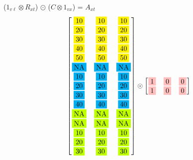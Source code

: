\documentclass[english]{beamer}
\begin{document}
\begin{frame}{(\(1_{v\ell} \otimes R_{xt}\)) \(\odot\) (\(C \otimes 1_{vx}\)) = $A_{xt}$}
\footnotesize
\[
\begin{bmatrix} 
\fcolorbox{white}{yellow}{10} & \fcolorbox{white}{yellow}{10} & \fcolorbox{white}{yellow}{10} \\ 
\fcolorbox{white}{yellow}{20} & \fcolorbox{white}{yellow}{20} & \fcolorbox{white}{yellow}{20} \\ 
\fcolorbox{white}{yellow}{30} & \fcolorbox{white}{yellow}{30} & \fcolorbox{white}{yellow}{30} \\ 
\fcolorbox{white}{yellow}{40} & \fcolorbox{white}{yellow}{40} & \fcolorbox{white}{yellow}{40} \\ 
\fcolorbox{white}{yellow}{50} & \fcolorbox{white}{yellow}{50} & \fcolorbox{white}{yellow}{50} \\ 
\fcolorbox{white}{cyan}{NA} & \fcolorbox{white}{cyan}{NA} & \fcolorbox{white}{cyan}{NA} \\
\fcolorbox{white}{cyan}{10} & \fcolorbox{white}{cyan}{10} & \fcolorbox{white}{cyan}{10} \\
\fcolorbox{white}{cyan}{20} & \fcolorbox{white}{cyan}{20} & \fcolorbox{white}{cyan}{20} \\
\fcolorbox{white}{cyan}{30} & \fcolorbox{white}{cyan}{30} & \fcolorbox{white}{cyan}{30} \\
\fcolorbox{white}{cyan}{40} & \fcolorbox{white}{cyan}{40} & \fcolorbox{white}{cyan}{40} \\ 
\fcolorbox{white}{lime}{NA} & \fcolorbox{white}{lime}{NA} & \fcolorbox{white}{lime}{NA} \\
\fcolorbox{white}{lime}{NA} & \fcolorbox{white}{lime}{NA} & \fcolorbox{white}{lime}{NA} \\
\fcolorbox{white}{lime}{10} & \fcolorbox{white}{lime}{10} & \fcolorbox{white}{lime}{10} \\
\fcolorbox{white}{lime}{20} & \fcolorbox{white}{lime}{20} & \fcolorbox{white}{lime}{20} \\
\fcolorbox{white}{lime}{30} & \fcolorbox{white}{lime}{30} & \fcolorbox{white}{lime}{30} \\
\end{bmatrix} \odot \begin{bmatrix}
\fcolorbox{white}{pink}{1} & \fcolorbox{white}{pink}{0} & \fcolorbox{white}{pink}{0} \\
\fcolorbox{white}{pink}{1} & \fcolorbox{white}{pink}{0} & \fcolorbox{white}{pink}{0} \\

\end{bmatrix}\]
\end{frame}
\end{document}
